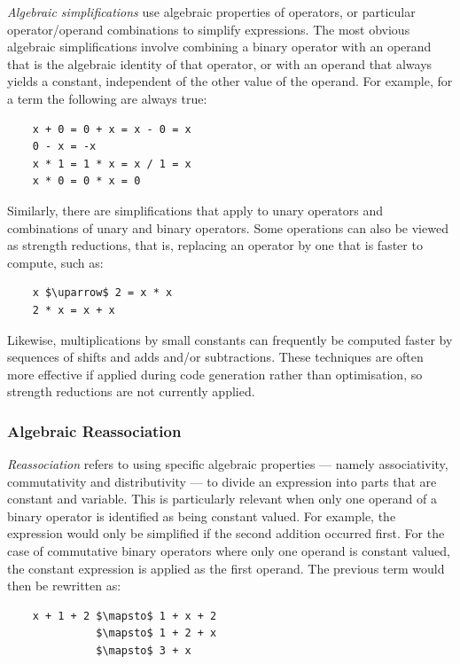 \emph{Algebraic simplifications} use algebraic properties of operators, or
particular operator/operand combinations to simplify expressions. The most
obvious algebraic simplifications involve combining a binary operator with an
operand that is the algebraic identity of that operator, or with an operand that
always yields a constant, independent of the other value of the operand. For
example, for a term  the following are always true:
%
\begin{lstlisting}[style=Haskell,numbers=none]
%\bf$\langle$ algebraic simplification $\rangle$%
    x + 0 = 0 + x = x - 0 = x
    0 - x = -x
    x * 1 = 1 * x = x / 1 = x
    x * 0 = 0 * x = 0
\end{lstlisting}
%
Similarly, there are simplifications that apply to unary operators and
combinations of unary and binary operators. Some operations can also be viewed
as strength reductions, that is, replacing an operator by one that is faster to
compute, such as:
%
\begin{lstlisting}[style=Haskell,numbers=none,mathescape]
%\bf$\langle$ strength reduction $\rangle$%
    x $\uparrow$ 2 = x * x
    2 * x = x + x
\end{lstlisting}
%
Likewise, multiplications by small constants can frequently be computed faster
by sequences of shifts and adds and/or subtractions. These techniques are often
more effective if applied during code generation rather than optimisation, so
strength reductions are not currently applied.


\subsubsection{Algebraic Reassociation}

\emph{Reassociation} refers to using specific algebraic properties --- namely
associativity, commutativity and distributivity --- to divide an expression into
parts that are constant and variable.
This is particularly relevant when only one operand of a binary
operator is identified as being constant valued. For example, the expression
 would only be simplified if the second addition occurred
first. For the case of commutative binary operators where only one operand is
constant valued, the constant expression is applied as the first operand. The
previous term would then be rewritten as:
%
\begin{lstlisting}[style=Haskell,numbers=none,mathescape]
%\bf$\langle$ algebraic reassociation $\rangle$%
    x + 1 + 2 $\mapsto$ 1 + x + 2
              $\mapsto$ 1 + 2 + x
              $\mapsto$ 3 + x
\end{lstlisting}


